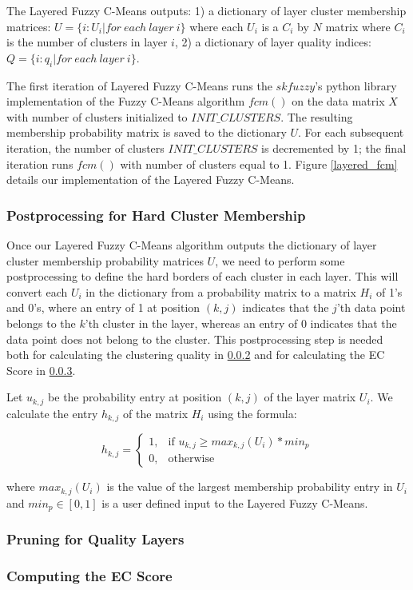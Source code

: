 The Layered Fuzzy C-Means outputs: 1) a dictionary of layer cluster membership matrices:  $U = \{i: U_{i} | for\ each\ layer\ i\}$ where each $U_{i}$ is a $C_{i}$ by $N$ matrix where $C_{i}$ is the number of clusters in layer $i$, 2) a dictionary of layer quality indices: $Q = \{i: q_{i} | for\ each\ layer\ i\}$.

The first iteration of Layered Fuzzy C-Means runs the $skfuzzy$'s python library implementation of the Fuzzy C-Means algorithm $fcm()$ \cite{} on the data matrix $X$ with number of clusters initialized to $INIT\_CLUSTERS$. The resulting membership probability matrix is saved to the dictionary $U$. For each subsequent iteration, the number of clusters $INIT\_CLUSTERS$ is decremented by 1; the final iteration runs $fcm()$ with number of clusters equal to 1. Figure \ref{layered_fcm} details our implementation of the Layered Fuzzy C-Means.

\subsubsection{Postprocessing for Hard Cluster Membership}
Once our Layered Fuzzy C-Means algorithm outputs the dictionary of layer cluster membership probability matrices $U$, we need to perform some postprocessing to define the hard borders of each cluster in each layer. This will convert each $U_{i}$ in the dictionary from a probability matrix to a matrix $H_{i}$ of 1's and 0's, where an entry of 1 at position $(k, j)$ indicates that the $j$'th data point belongs to the $k$'th cluster in the layer, whereas an entry of 0 indicates that the data point does not belong to the cluster. This postprocessing step is needed both for calculating the clustering quality in \ref{pruning_layers} and for calculating the EC Score in \ref{calc_ec}.

Let $u_{k,j}$ be the probability entry at position $(k,j)$ of the layer matrix $U_{i}$. We calculate the entry $h_{k,j}$ of the matrix $H_{i}$ using the formula:

\begin{equation}
h_{k,j} = 
\begin{cases}
    1,& \text{if } u_{k,j}\geq max_{k,j}(U_{i}) * min_p\\
    0,              & \text{otherwise}
\end{cases}
\end{equation}

where $max_{k,j}(U_{i})$ is the value of the largest membership probability entry in $U_{i}$ and $min_p \in [0,1]$ is a user defined input to the Layered Fuzzy C-Means.

\subsubsection{Pruning for Quality Layers}\label{pruning_layers}


\subsubsection{Computing the EC Score}\label{calc_ec}


